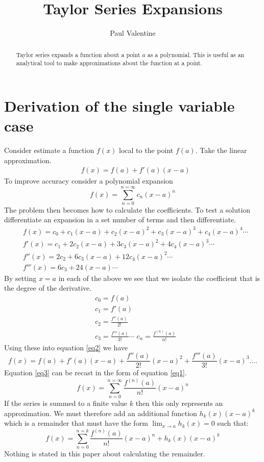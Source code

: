 \documentclass[a4paper]{article}
\title{\textbf{Taylor Series Expansions}}
\author{Paul Valentine}
\begin{document}
\maketitle
\begin{abstract}
Taylor series expands a function about a point $a$ as a polynomial. This is useful as an analytical tool to make approximations about the function at a point. 
\end{abstract}
\section{Derivation of the single variable case}

Consider estimate a function $f(x)$ local to the point $f(a)$. Take the linear approximation.
\begin{align}
&f(x) = f(a)+f'(a)(x-a)
\end{align}
To improve accuracy consider a polynomial expansion 
\begin{equation}
\label{eq1}
f(x)=\sum_{n=0}^{n=\infty}	c_n (x-a)^n
\end{equation}
The problem then becomes how to calculate the coefficients. To test a solution differentiate an expansion in a set number of terms and then differentiate. 
\begin{align}
&f(x) = c_0 + c_1 (x-a) + c_2 (x-a)^2 + c_3 (x-a)^3 + c_4 (x-a)^4\cdots\label{eq2}\\
&f'(x) = c_1 + 2 c_2 (x-a) + 3c_3 (x-a)^2 +4c_4 (x-a)^3 \cdots\\
&f''(x) = 2 c_2 + 6c_3(x-a) + 12c_4(x-a)^2\cdots\\
&f'''(x)=6c_3 + 24(x-a) \cdots
\end{align}
By setting $x=a$ in each of the above we see that we isolate the coefficient that is the degree of the derivative.
\begin{align}
&c_0 = f(a)\\
&c_1 = f'(a)\\
&c_2 = \frac{f''(a)}{2!}\\
&c_3 = \frac{f'''(a)}{3!}\cdots\; c_n =\frac{f^{(n)}(a)}{n!}
\end{align}
Using these into equation \ref{eq2} we have
\begin{equation}
\label{eq3}
f(x) = f(a) + f'(a)(x-a) + \frac{f''(a)}{2!}(x-a)^2+\frac{f'''(a)}{3!}(x-a)^3 \dot{....}
\end{equation}
Equation \ref{eq3} can be recast in the form of equation \ref{eq1}.
\begin{equation}
f(x)=\sum_{n=0}^{n=\infty} \frac{f^{(n)}(a)}{n!} (x-a)^n
\end{equation}
If the series is summed to a finite value $k$ then this only represents an approximation. We must therefore add an additional function $h_k(x)(x-a)^k$ which is a remainder that must have the form $\displaystyle{\lim_{x\to a}}h_k(x)=0$ such that:
\begin{equation}
f(x)=\sum_{n=0}^{n=k} \frac{f^{(n)}(a)}{n!} (x-a)^n +h_k(x)(x-a)^k
\end{equation}
Nothing is stated in this paper about calculating the remainder.

\end{document}
